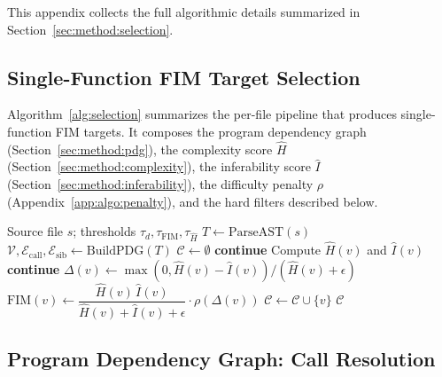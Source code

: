 This appendix collects the full algorithmic details summarized in
Section~\ref{sec:method:selection}.

\subsection{Single-Function FIM Target Selection}
\label{app:algo:single}

Algorithm~\ref{alg:selection} summarizes the per-file pipeline that
produces single-function FIM targets. It composes the program
dependency graph (Section~\ref{sec:method:pdg}), the complexity score
$\hat{H}$ (Section~\ref{sec:method:complexity}), the inferability score
$\hat{I}$ (Section~\ref{sec:method:inferability}), the difficulty
penalty $\rho$ (Appendix~\ref{app:algo:penalty}), and the hard filters
described below.

\begin{algorithm}[h]
\caption{Single-function FIM target selection for one file.}
\label{alg:selection}
\begin{algorithmic}[1]
  \Require Source file $s$; thresholds $\tau_d, \tau_{\mathrm{FIM}}, \tau_{\hat H}$
  \State $T \gets \mathrm{ParseAST}(s)$
  \State $\mathcal{V}, \mathcal{E}_{\mathrm{call}}, \mathcal{E}_{\mathrm{sib}} \gets \mathrm{BuildPDG}(T)$
  \State $\mathcal{C} \gets \emptyset$
      \State \textbf{continue}
    \EndIf
    \State Compute $\hat{H}(v)$ and $\hat{I}(v)$
     \textbf{continue} \EndIf
    \State $\Delta(v) \gets \max(0, \hat{H}(v)-\hat{I}(v)) / (\hat{H}(v)+\epsilon)$
    \State $\mathrm{FIM}(v) \gets \dfrac{\hat{H}(v)\,\hat{I}(v)}{\hat{H}(v)+\hat{I}(v)+\epsilon}\cdot \rho(\Delta(v))$
      \State $\mathcal{C} \gets \mathcal{C} \cup \{v\}$
    \EndIf
  \EndFor
  \State \Return $\mathcal{C}$ 
\end{algorithmic}
\end{algorithm}

\subsection{Program Dependency Graph: Call Resolution}
\label{app:algo:pdg}


